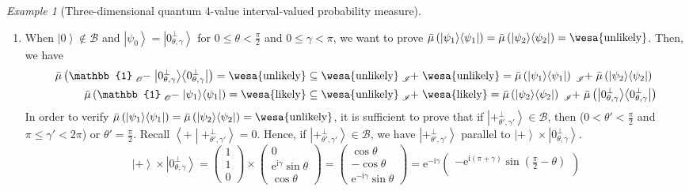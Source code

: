 \documentclass{article}
\theoremstyle{remark}
\newtheorem{example}{Example}
\newcommand{\likely}{{\mbox{\wesa{likely}}}}
\newcommand{\unlikely}{{\mbox{\wesa{unlikely}}}}
\newcommand{\ket}[1]{{\left\vert{#1}\right\rangle}}
\newcommand{\op}[2]{\ensuremath{\left\vert{#1}\middle\rangle\middle\langle{#2}\right\vert}}
\newcommand{\proj}[1]{\op{#1}{#1}}
\newcommand{\ps}{\texttt{+}}
\newcommand{\ip}[2]{\ensuremath{\left\langle{#1}\middle\vert{#2}\right\rangle}}
\newcommand{\rme}{\mathrm{e}}
\newcommand{\rmi}{\mathrm{i}}
\begin{document}
\begin{example}[Three-dimensional quantum 4-value interval-valued
probability measure]
\begin{enumerate}
\begin{equation}
\begin{aligned}
\end{aligned}
\label{eq:case1}
\end{equation}
Similarly, when $\ket{\psi_{0}}$ is $\ket{\ps}$, equation~(\ref{eq:non-additive-vectors})
holds. 
\item When $\ket{0}\notin\mathcal{B}$ and $\ket{\psi_{0}}=\ket{0_{\theta,\gamma}^{\perp}}$
for $0\le\theta<\frac{\pi}{2}$ and $0\le\gamma<\pi$, we want to
prove $\bar{\mu}\left(\proj{\psi_{1}}\right)=\bar{\mu}\left(\proj{\psi_{2}}\right)=\unlikely$.
Then, we have 
\begin{equation}
\begin{aligned}\bar{\mu}\left(\mathbb{1}\tensor*[_{\mathscr{O}}]{-}{}\proj{0_{\theta,\gamma}^{\perp}}\right)=\unlikely & \subseteq\unlikely\tensor*[_{\mathscr{I}}]{+}{}\unlikely=\bar{\mu}\left(\proj{\psi_{1}}\right)\tensor*[_{\mathscr{I}}]{+}{}\bar{\mu}\left(\proj{\psi_{2}}\right)\\
\bar{\mu}\left(\mathbb{1}\tensor*[_{\mathscr{O}}]{-}{}\proj{\psi_{1}}\right)=\likely & \subseteq\unlikely\tensor*[_{\mathscr{I}}]{+}{}\likely=\bar{\mu}\left(\proj{\psi_{2}}\right)\tensor*[_{\mathscr{I}}]{+}{}\bar{\mu}\left(\proj{0_{\theta,\gamma}^{\perp}}\right)
\end{aligned}
\label{eq:case2}
\end{equation}
In order to verify $\bar{\mu}\left(\proj{\psi_{1}}\right)=\bar{\mu}\left(\proj{\psi_{2}}\right)=\unlikely$,
it is sufficient to prove that if $\ket{\ps_{\theta',\gamma'}^{\perp}}\in\mathcal{B}$,
then ($0<\theta'<\frac{\pi}{2}$ and $\pi\le\gamma'<2\pi$) or $\theta'=\frac{\pi}{2}$.
Recall $\ip{\ps}{\ps_{\theta',\gamma'}^{\perp}}=0$. Hence, if $\ket{\ps_{\theta',\gamma'}^{\perp}}\in\mathcal{B}$,
we have $\ket{\ps_{\theta',\gamma'}^{\perp}}$ parallel to $\ket{\ps}\times\ket{0_{\theta,\gamma}^{\perp}}$.
\begin{equation}
\ket{\ps}\times\ket{0_{\theta,\gamma}^{\perp}}=\begin{pmatrix}1\\
1\\
0
\end{pmatrix}\times\begin{pmatrix}0\\
\rme^{\rmi\gamma}\sin\theta\\
\cos\theta
\end{pmatrix}=\begin{pmatrix}\cos\theta\\
-\cos\theta\\
\rme^{-\rmi\gamma}\sin\theta
\end{pmatrix}=\rme^{-\rmi\gamma}\begin{pmatrix}-\rme^{\rmi\left(\pi+\gamma\right)}\sin\left(\frac{\pi}{2}-\theta\right)\\

\end{pmatrix}
\end{equation}
\end{enumerate}
\end{example}
\end{document}
